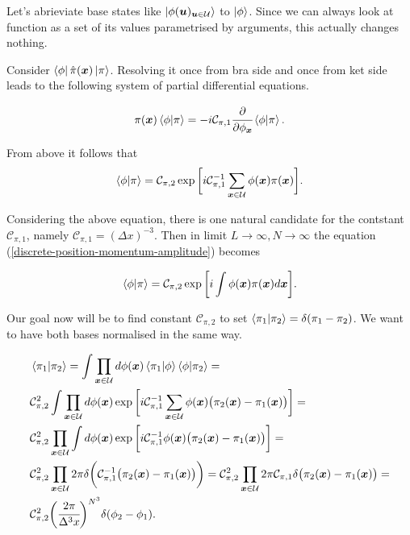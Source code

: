 \documentclass[main.tex]{subfiles}
\begin{document}
Let's abrieviate base states like $\ket{\phi(\boldsymbol{u})_{\boldsymbol{u}\in \mathcal{U}}}$ to $\ket{\phi}$. Since we can always look at function as a set of its values parametrised by arguments, this actually changes nothing.

Consider $\bra{\phi}\hat{\pi}(\boldsymbol{x})\ket{\pi}$. Resolving it once from bra side and once from ket side leads to the following system of partial differential equations.

\begin{equation}
\pi(\boldsymbol{x}) \bra{\phi}\ket{\pi} = -i \mathcal{C}_{\pi,1}
\cfrac{\partial}{\partial \phi_{\boldsymbol{x}}} \bra{\phi}\ket{\pi}.
\end{equation}

From above it follows that
\begin{equation}
\label{discrete-position-momentum-amplitude}
\bra{\phi}\ket{\pi} = \mathcal{C}_{\pi,2}
\exp\bigg[ i \mathcal{C}^{-1}_{\pi, 1} \sum_{\boldsymbol{x}\in\mathcal{U}} \phi(\boldsymbol{x})\pi(\boldsymbol{x})\bigg].
\end{equation}

Considering the above equation, there is one natural candidate for the contstant $\mathcal{C}_{\pi, 1}$, namely $\mathcal{C}_{\pi, 1} = (\Delta x)^{-3}$. 
Then in limit $L\to \infty, N\to \infty$ the equation (\ref{discrete-position-momentum-amplitude}) becomes

\begin{equation}
\bra{\phi}\ket{\pi} = \mathcal{C}_{\pi,2}
\exp\bigg[ i \int  \phi(\boldsymbol{x})\pi(\boldsymbol{x})d\boldsymbol{x}\bigg].
\end{equation}

Our goal now will be to find constant $\mathcal{C}_{\pi, 2}$ to set $\bra{\pi_1}\ket{\pi_2} = \delta(\pi_1 - \pi_2)$. We want to have both bases normalised in the same way.

\begin{align*}
& \bra{\pi_1}\ket{\pi_2} = \int \prod_{\boldsymbol{x}\in \mathcal{U}} d\phi(\boldsymbol{x}) \bra{\pi_1}\ket{\phi}\bra{\phi}\ket{\pi_2} = \\
& \mathcal{C}^2_{\pi,2}\int \prod_{\boldsymbol{x}\in \mathcal{U}} d\phi(\boldsymbol{x}) 
\exp\bigg[i \mathcal{C}^{-1}_{\pi, 1}\sum_{\boldsymbol{x}\in\mathcal{U}} \phi(\boldsymbol{x})\big(\pi_2(\boldsymbol{x})
- \pi_1(\boldsymbol{x})\big)\bigg] = \\
& \mathcal{C}^2_{\pi,2} \prod_{\boldsymbol{x}\in \mathcal{U}} \int d\phi(\boldsymbol{x}) 
\exp\bigg[ i \mathcal{C}^{-1}_{\pi, 1} \phi(\boldsymbol{x})\big(\pi_2(\boldsymbol{x})
- \pi_1(\boldsymbol{x})\big)\bigg] = \\
& \mathcal{C}^2_{\pi,2} \prod_{\boldsymbol{x}\in \mathcal{U}} 2\pi
\delta\bigg(\mathcal{C}^{-1}_{\pi, 1}\big(\pi_2(\boldsymbol{x}) 
- \pi_1(\boldsymbol{x})\big)\bigg) = 
\mathcal{C}^2_{\pi,2} \prod_{\boldsymbol{x}\in \mathcal{U}} 2\pi\mathcal{C}_{\pi, 1}
\delta\big(\pi_2(\boldsymbol{x}) - \pi_1(\boldsymbol{x})\big) = \\
& \mathcal{C}^2_{\pi,2}\bigg(\cfrac{2\pi}{\Delta^3 x} \bigg)^{N^3} \delta(\phi_2 - \phi_1).
\end{align*}
\end{document}
